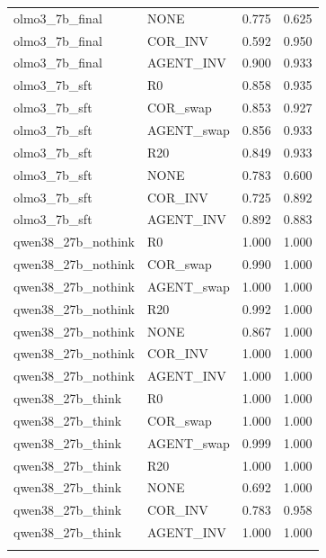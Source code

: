 {\begin{longtable}{llrr}
olmo3\_7b\_final & NONE & 0.775 & 0.625 \\
olmo3\_7b\_final & COR\_INV & 0.592 & 0.950 \\
olmo3\_7b\_final & AGENT\_INV & 0.900 & 0.933 \\
olmo3\_7b\_sft & R0 & 0.858 & 0.935 \\
olmo3\_7b\_sft & COR\_swap & 0.853 & 0.927 \\
olmo3\_7b\_sft & AGENT\_swap & 0.856 & 0.933 \\
olmo3\_7b\_sft & R20 & 0.849 & 0.933 \\
olmo3\_7b\_sft & NONE & 0.783 & 0.600 \\
olmo3\_7b\_sft & COR\_INV & 0.725 & 0.892 \\
olmo3\_7b\_sft & AGENT\_INV & 0.892 & 0.883 \\
qwen38\_27b\_nothink & R0 & 1.000 & 1.000 \\
qwen38\_27b\_nothink & COR\_swap & 0.990 & 1.000 \\
qwen38\_27b\_nothink & AGENT\_swap & 1.000 & 1.000 \\
qwen38\_27b\_nothink & R20 & 0.992 & 1.000 \\
qwen38\_27b\_nothink & NONE & 0.867 & 1.000 \\
qwen38\_27b\_nothink & COR\_INV & 1.000 & 1.000 \\
qwen38\_27b\_nothink & AGENT\_INV & 1.000 & 1.000 \\
qwen38\_27b\_think & R0 & 1.000 & 1.000 \\
qwen38\_27b\_think & COR\_swap & 1.000 & 1.000 \\
qwen38\_27b\_think & AGENT\_swap & 0.999 & 1.000 \\
qwen38\_27b\_think & R20 & 1.000 & 1.000 \\
qwen38\_27b\_think & NONE & 0.692 & 1.000 \\
qwen38\_27b\_think & COR\_INV & 0.783 & 0.958 \\
qwen38\_27b\_think & AGENT\_INV & 1.000 & 1.000 \\
\botrule
\end{longtable}}
\addtocounter{table}{-1}
